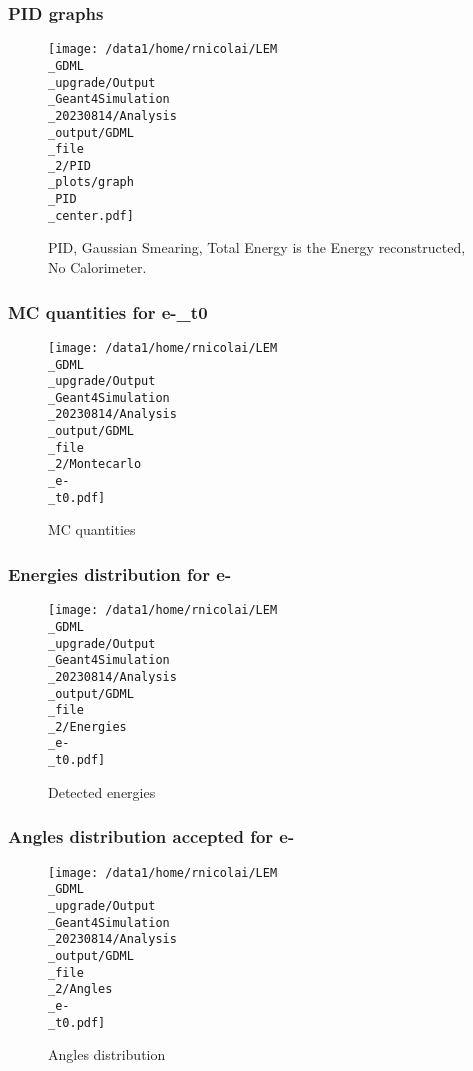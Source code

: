 \documentclass[8pt]{beamer}
\begin{document}
            \begin{frame}
                \frametitle{PID graphs}
            
        \begin{figure}[h]
            \centering
            \texttt{[image: /data1/home/rnicolai/LEM\\\_GDML\\\_upgrade/Output\\\_Geant4Simulation\\\_20230814/Analysis\\\_output/GDML\\\_file\\\_2/PID\\\_plots/graph\\\_PID\\\_center.pdf]}
            \caption{PID, Gaussian Smearing, Total Energy is the Energy reconstructed, No Calorimeter.}
        \end{figure}
        
            \end{frame}
            
            \begin{frame}
                \frametitle{MC quantities for e-\_t0}
            
        \begin{figure}[h]
            \centering
            \texttt{[image: /data1/home/rnicolai/LEM\\\_GDML\\\_upgrade/Output\\\_Geant4Simulation\\\_20230814/Analysis\\\_output/GDML\\\_file\\\_2/Montecarlo\\\_e-\\\_t0.pdf]}
            \caption{MC quantities}
        \end{figure}
        
            \end{frame}
            
            \begin{frame}
                \frametitle{Energies distribution for e-}
            
        \begin{figure}[h]
            \centering
            \texttt{[image: /data1/home/rnicolai/LEM\\\_GDML\\\_upgrade/Output\\\_Geant4Simulation\\\_20230814/Analysis\\\_output/GDML\\\_file\\\_2/Energies\\\_e-\\\_t0.pdf]}
            \caption{Detected energies}
        \end{figure}
        
            \end{frame}
            
            \begin{frame}
                \frametitle{Angles distribution accepted for e-}
            
        \begin{figure}[h]
            \centering
            \texttt{[image: /data1/home/rnicolai/LEM\\\_GDML\\\_upgrade/Output\\\_Geant4Simulation\\\_20230814/Analysis\\\_output/GDML\\\_file\\\_2/Angles\\\_e-\\\_t0.pdf]}
            \caption{Angles distribution}
        \end{figure}
        
            \end{frame}
            
\end{document}
